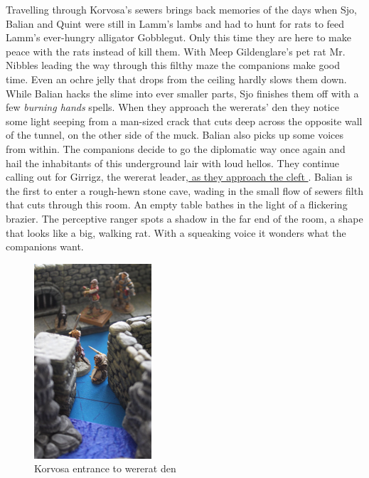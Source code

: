 Travelling through Korvosa's sewers brings back memories of the days when Sjo, Balian and Quint were still in Lamm's lambs and had to hunt for rats to feed Lamm's ever-hungry alligator Gobblegut. Only this time they are here to make peace with the rats instead of kill them. With Meep Gildenglare's pet rat Mr. Nibbles leading the way through this filthy maze the companions make good time. Even an ochre jelly that drops from the ceiling hardly slows them down. While Balian hacks the slime into ever smaller parts, Sjo finishes them off with a few {\itshape burning hands} spells. When they approach the wererats' den they notice some light seeping from a man-sized crack that cuts deep across the opposite wall of the tunnel, on the other side of the muck. Balian also picks up some voices from within. The companions decide to go the diplomatic way once again and hail the inhabitants of this underground lair with loud hellos. They continue calling out for Girrigz, the wererat leader,\hyperref[fig:Korvosa-entrance-to-wererat-den-503383346]{ as they approach the cleft } . Balian is the first to enter a rough-hewn stone cave, wading in the small flow of sewers filth that cuts through this room. An empty table bathes in the light of a flickering brazier. The perceptive ranger spots a shadow in the far end of the room, a shape that looks like a big, walking rat. With a squeaking voice it wonders what the companions want. \\

\begin{figure}[h]
	\centering
	\includegraphics[width=0.39\textwidth]{images/Korvosa-entrance-to-wererat-den-503383346.jpg}
	\caption{Korvosa entrance to wererat den}
	\label{fig:Korvosa-entrance-to-wererat-den-503383346}
\end{figure}

